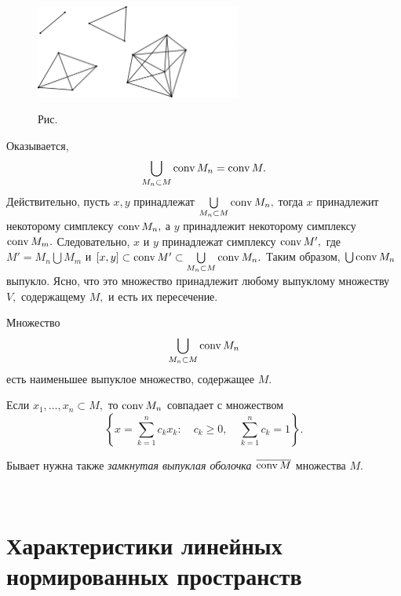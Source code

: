   \begin{figure}[ht]
\begin{center}
\includegraphics[width=0.6\textwidth]{pict08-2.eps}
\end{center}
 \bigskip
 \label{r8-2}

 \centerline{Рис.~\theris}
 \bigskip
\end{figure}

 \vspace{5mm}

Оказывается,
 $$
 \bigcup_{M_n\subset M} {\rm conv\,} M_n={\rm conv\,} M.
 $$
 Действительно, пусть $x,y$ принадлежат
 $ \bigcup\limits_{M_n\subset M} {\rm conv\,} M_n,$
 тогда $x$ принадлежит некоторому симплексу ${\rm conv\,} M_n,$
 а $y$ принадлежит некоторому симплексу ${\rm conv\,} M_m.$
 Следовательно, $x$ и $y$ принадлежат {симплексу} ${\rm conv\,} M',$ где $M'=M_n
 \bigcup M_m$ и $[x,y]\subset {\rm conv\,} M' \subset
 \bigcup\limits_{M_n\subset M} {\rm conv\,} M_n.$ Таким образом, $\bigcup
 {\rm conv\,} M_n$ выпукло. {Ясно, что это множество} принадлежит любому выпуклому множеству $V,$
 содержащему $M,$ и есть их пересечение.

 \begin{Corollary} %
 {Множество}
 $$
 \bigcup_{M_n\subset M} {\rm conv\,} M_n
 $$
 есть наименьшее выпуклое множество, содержащее $M.$
 \end{Corollary}

 \begin{Remark} %
 Если $x_1,\ldots, x_n\subset M,$ то ${\rm conv\,} M_n$ {совпадает с множеством}
 $$
 \left\{x=\sum\limits_{k=1}^n c_kx_k:\quad c_k\ge 0,\quad \sum\limits_{k=1}^n
 c_k=1\right\}.
 $$
 \end{Remark}

Бывает нужна также {\it замкнутая выпуклая оболочка} $\overline{{\rm conv\,} M}$
множества $M.$

\ \

\section{Характеристики линейных нормированных пространств}

